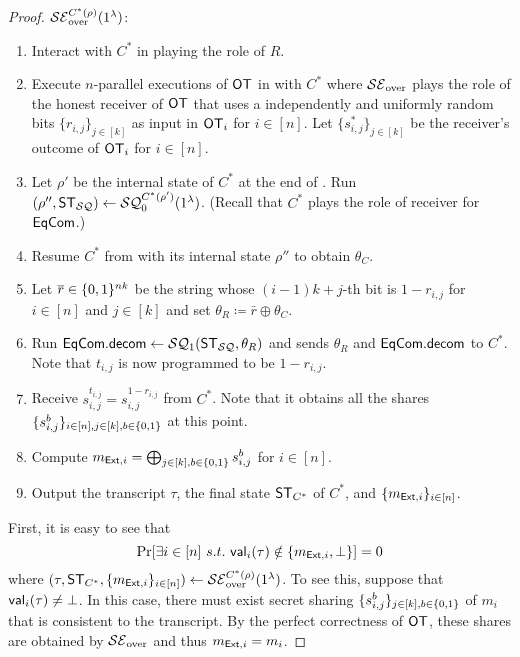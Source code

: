 \begin{proof}
\smallskip
\noindent
$\mathcal{SE}_{\mathrm{over}}^{C^*(\rho)}(1^\lambda)$: 
\begin{enumerate}
\item Interact with $C^*$ in  playing the role of $R$. 
\item Execute $n$-parallel executions of $\mathsf{OT}$ in   with $C^*$ where $\mathcal{SE}_{\mathrm{over}}$ plays the role of the honest receiver of $\mathsf{OT}$ that uses a independently and uniformly random bits $\{r_{i,j}\}_{j\in[k]}$ as input in $\mathsf{OT}_i$ for $i\in [n]$.  Let $\{s^*_{i,j}\}_{j\in[k]}$ be the receiver's outcome of $\mathsf{OT}_i$ for $i\in [n]$. 
\item 
Let $\rho'$ be the internal state of $C^*$ at the end of . 
Run $(\rho'',\mathsf{ST}_{\mathcal{SQ}})\gets \mathcal{SQ}_0^{C^*(\rho')}(1^\lambda)$. (Recall that $C^*$ plays the role of receiver for $\mathsf{EqCom}$.)   
\item Resume $C^*$ from  with its internal state $\rho''$ to obtain $\theta_C$. 
\item   
Let $\overline{r}\in \{0,1\}^{nk}$ be the string whose $(i-1)k+j$-th bit is $1-r_{i,j}$ for $i\in[n]$ and $j\in[k]$ and set $\theta_R\coloneqq \bar{r}\oplus \theta_C$. 
\item Run $\mathsf{EqCom}.\mathsf{decom}\gets \mathcal{SQ}_1(\mathsf{ST}_{\mathcal{SQ}},\theta_R)$ and sends $\theta_R$ and $\mathsf{EqCom}.\mathsf{decom}$ to $C^*$. 
Note that $t_{i,j}$ is now programmed to be $1-r_{i,j}$. 
\item Receive $s_{i,j}^{t_{i,j}}=s_{i,j}^{1-r_{i,j}}$ from $C^*$. Note that it obtains all the shares $\{s_{i,j}^b\}_{i\in[n],j\in[k],b\in\{0,1\}}$ at this point. 
\item Compute $m_{\mathsf{Ext},i}=\bigoplus_{j\in[k],b\in\{0,1\}}s_{i,j}^b$ for $i \in [n]$.
\item Output the transcript $\tau$, the final state $\mathsf{ST}_{C^*}$ of $C^*$, and $\{m_{\mathsf{Ext},i}\}_{i\in[n]}$. 
\end{enumerate}

First, it is easy to see that 
\begin{equation*}
    \Pr[\exists i\in[n]~s.t.~\mathsf{val}_i(\tau)\notin\{m_{\mathsf{Ext},i},\bot\}]=0
\end{equation*}
where 
$(\tau,\mathsf{ST}_{C^*},\{m_{\mathsf{Ext},i}\}_{i\in[n]})\gets \mathcal{SE}_{\mathrm{over}}^{C^*(\rho)}(1^\lambda)$. 
To see this, suppose that $\mathsf{val}_i(\tau)\neq \bot$. In this case, there must exist secret sharing $\{s_{i,j}^b\}_{j\in[k],b\in\{0,1\}}$ of $m_i$ that is consistent to the transcript. By the perfect correctness of $\mathsf{OT}$,  these shares are obtained by $\mathcal{SE}_{\mathrm{over}}$ and thus $m_{\mathsf{Ext},i}=m_i$. 


\end{proof}

